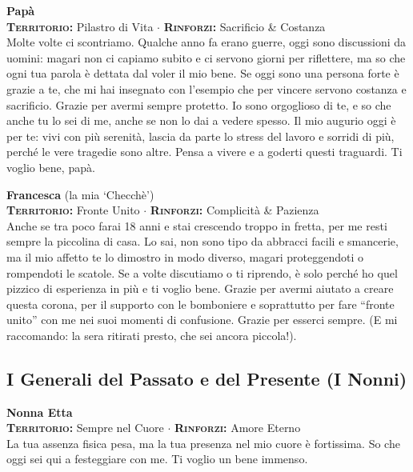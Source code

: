 \noindent\begin{minipage}{\linewidth}
\textbf{Papà} \\
{\footnotesize \textbf{\textsc{Territorio:}} Pilastro di Vita $\cdot$ \textbf{\textsc{Rinforzi:}} Sacrificio \& Costanza} \\
Molte volte ci scontriamo. Qualche anno fa erano guerre, oggi sono discussioni da uomini: magari non ci capiamo subito e ci servono giorni per riflettere, ma so che ogni tua parola è dettata dal voler il mio bene. Se oggi sono una persona forte è grazie a te, che mi hai insegnato con l'esempio che per vincere servono costanza e sacrificio. Grazie per avermi sempre protetto. Io sono orgoglioso di te, e so che anche tu lo sei di me, anche se non lo dai a vedere spesso. Il mio augurio oggi è per te: vivi con più serenità, lascia da parte lo stress del lavoro e sorridi di più, perché le vere tragedie sono altre. Pensa a vivere e a goderti questi traguardi. Ti voglio bene, papà.
\end{minipage}
\vspace{0.6cm}

\noindent\begin{minipage}{\linewidth}
\textbf{Francesca} (la mia `Checchè') \\
{\footnotesize \textbf{\textsc{Territorio:}} Fronte Unito $\cdot$ \textbf{\textsc{Rinforzi:}} Complicità \& Pazienza} \\
Anche se tra poco farai 18 anni e stai crescendo troppo in fretta, per me resti sempre la piccolina di casa. Lo sai, non sono tipo da abbracci facili e smancerie, ma il mio affetto te lo dimostro in modo diverso, magari proteggendoti o rompendoti le scatole. Se a volte discutiamo o ti riprendo, è solo perché ho quel pizzico di esperienza in più e ti voglio bene. Grazie per avermi aiutato a creare questa corona, per il supporto con le bomboniere e soprattutto per fare ``fronte unito'' con me nei suoi momenti di confusione. Grazie per esserci sempre. (E mi raccomando: la sera ritirati presto, che sei ancora piccola!).
\end{minipage}

\subsection*{I Generali del Passato e del Presente (I Nonni)}

\noindent\begin{minipage}{\linewidth}
\textbf{Nonna Etta} \\
{\footnotesize \textbf{\textsc{Territorio:}} Sempre nel Cuore $\cdot$ \textbf{\textsc{Rinforzi:}} Amore Eterno} \\
La tua assenza fisica pesa, ma la tua presenza nel mio cuore è fortissima. So che oggi sei qui a festeggiare con me. Ti voglio un bene immenso.
\end{minipage}
\vspace{0.6cm}

